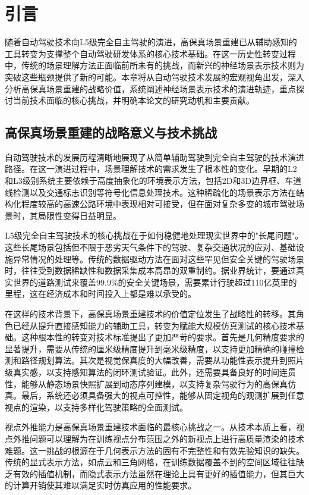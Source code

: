 
\chapter{引言}

随着自动驾驶技术向L5级完全自主驾驶的演进，高保真场景重建已从辅助感知的工具转变为支撑整个自动驾驶研发体系的核心技术基础。在这一历史性转变过程中，传统的场景理解方法正面临前所未有的挑战，而新兴的神经场景表示技术则为突破这些瓶颈提供了新的可能。本章将从自动驾驶技术发展的宏观视角出发，深入分析高保真场景重建的战略价值，系统阐述神经场景表示技术的演进轨迹，重点探讨当前技术面临的核心挑战，并明确本论文的研究动机和主要贡献。

\section{高保真场景重建的战略意义与技术挑战}

自动驾驶技术的发展历程清晰地展现了从简单辅助驾驶到完全自主驾驶的技术演进路径。在这一演进过程中，场景理解技术的需求发生了根本性的变化。早期的L2和L3级别系统主要依赖于高度抽象化的环境表示方法，包括2D和3D边界框、车道线检测以及交通标志识别等符号化信息处理技术\cite{chen2025snerf}。这种稀疏化的场景表示方法在结构化程度较高的高速公路环境中表现相对可接受，但在面对复杂多变的城市驾驶场景时，其局限性变得日益明显。

L5级完全自主驾驶技术的核心挑战在于如何稳健地处理现实世界中的"长尾问题"。这些长尾场景包括但不限于恶劣天气条件下的驾驶、复杂交通状况的应对、基础设施异常情况的处理等。传统的数据驱动方法在面对这些罕见但安全关键的驾驶场景时，往往受到数据稀缺性和数据采集成本高昂的双重制约\cite{yan2024street}。据业界统计，要通过真实世界的道路测试来覆盖99.9\%的安全关键场景，需要累计行驶超过110亿英里的里程，这在经济成本和时间投入上都是难以承受的。

在这样的技术背景下，高保真场景重建技术的价值定位发生了战略性的转移。其角色已经从提升直接感知能力的辅助工具，转变为赋能大规模仿真测试的核心技术基础。这种根本性的转变对技术标准提出了更加严苛的要求。首先是几何精度要求的显著提升，需要从传统的厘米级精度提升到毫米级精度，以支持更加精确的碰撞检测和路径规划算法。其次是视觉保真度的大幅改善，需要从功能性表示提升到照片级真实感，以支持感知算法的闭环测试验证。此外，还需要具备良好的时间连贯性，能够从静态场景快照扩展到动态序列建模，以支持复杂驾驶行为的高保真仿真。最后，系统还必须具备强大的视点可控性，能够从固定视角的观测扩展到任意视点的渲染，以支持多样化驾驶策略的全面测试。

视点外推能力是高保真场景重建技术面临的最核心挑战之一。从技术本质上看，视点外推问题可以理解为在训练视点分布范围之外的新视点上进行高质量渲染的技术难题。这一挑战的根源在于几何表示方法的固有不完整性和有效先验知识的缺失。传统的显式表示方法，如点云和三角网格，在训练数据覆盖不到的空间区域往往缺乏有效的插值机制，而隐式表示方法虽然在理论上具有更好的插值能力，但其巨大的计算开销使其难以满足实时仿真应用的性能要求。

